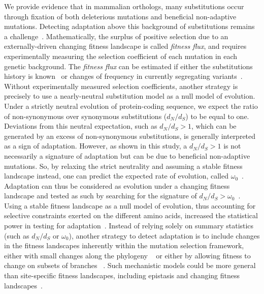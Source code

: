 \documentclass[10pt,letterpaper]{article}
\newcommand{\dn}{d_N}
\newcommand{\ds}{d_S}
\newcommand{\dnds}{\dn / \ds}
\begin{document}
We provide evidence that in mammalian orthologs, many substitutions occur through fixation of both deleterious mutations and beneficial non-adaptive mutations.
Detecting adaptation above this background of substitutions remains a challenge~\cite{kimura_evolutionary_1968, ohta_development_1996}.
Mathematically, the surplus of positive selection due to an externally-driven changing fitness landscape is called \textit{fitness flux}, and requires experimentally measuring the selection coefficient of each mutation in each genetic background.
The \textit{fitness flux} can be estimated if either the substitutions history is known~\cite{mustonen_fitness_2009} or changes of frequency in currently segregating variants~\cite{mustonen_fitness_2010}.
Without experimentally measured selection coefficients, another strategy is precisely to use a nearly-neutral substitution model as a null model of evolution.
Under a strictly neutral evolution of protein-coding sequence, we expect the ratio of non-synonymous over synonymous substitutions ($\dnds$) to be equal to one.
Deviations from this neutral expectation, such as $\dnds > 1$, which can be generated by an excess of non-synonymous substitutions, is generally interpreted as a sign of adaptation.
However, as shown in this study, a $\dnds > 1$ is not necessarily a signature of adaptation but can be due to beneficial non-adaptive mutations.
So, by relaxing the strict neutrality and assuming a stable fitness landscape instead, one can predict the expected rate of evolution, called $\omega_0$~\cite{spielman_relationship_2015, dosreis_how_2015}.
Adaptation can thus be considered as evolution under a changing fitness landscape and tested as such by searching for the signature of $\dnds > \omega_0$~\cite{cvijovic_fate_2015, rodrigue_detecting_2017, rodrigue_bayesian_2021}.
Using a stable fitness landscape as a null model of evolution, thus accounting for selective constraints exerted on the different amino acids, increased the statistical power in testing for adaptation~\cite{latrille_genes_2023}.
Instead of relying solely on summary statistics (such as $\dnds$ or $\omega_0$), another strategy to detect adaptation is to include changes in the fitness landscapes inherently within the mutation selection framework, either with small changes along the phylogeny ~\cite{tamuri_mutationselection_2021} or either by allowing fitness to change on subsets of branches ~\cite{kazmi_detecting_2019, stolyarova_senescence_2020}.
Such mechanistic models could be more general than site-specific fitness landscapes, including epistasis and changing fitness landscapes~\cite{goldstein_sequence_2017, stolyarova_senescence_2020}.
\end{document}
